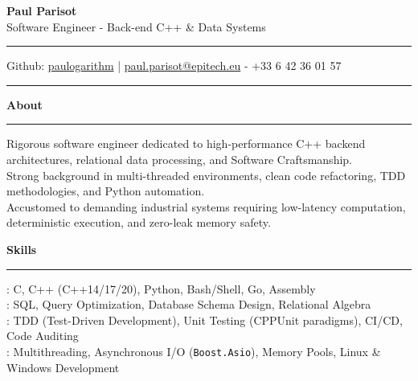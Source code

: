 \documentclass[9pt]{extarticle}
\begin{document}
\begin{center}
    {\huge\bfseries Paul Parisot}
    \\[10pt]
    {\Large Software Engineer - Back-end C++ \& Data Systems}
    \\
\end{center}

\par\vspace{-10pt}
\rule{\linewidth}{0.4pt}
\par\vspace{-10pt}

\begin{center}
    Github: \href{https://github.com/paulogarithm}{paulogarithm} 
    \quad | \quad 
    \href{mailto:paul.parisot@epitech.eu}{paul.parisot@epitech.eu} - +33 6 42 36 01 57
\end{center}

\par\vspace{-15pt}
\rule{\linewidth}{0.4pt}
\par\vspace{5pt}

{\large\bfseries About}
\par\vspace{-8pt}
\rule{\linewidth}{0.4pt}
\par\vspace{5pt}

Rigorous software engineer dedicated to high-performance C++ backend architectures, relational data processing, and Software Craftsmanship. \\
Strong background in multi-threaded environments, clean code refactoring, TDD methodologies, and Python automation. \\
Accustomed to demanding industrial systems requiring low-latency computation, deterministic execution, and zero-leak memory safety.

\par\vspace{5pt}

{\large\bfseries Skills}
\par\vspace{-8pt}
\rule{\linewidth}{0.4pt}
\par\vspace{5pt}

\hspace*{5pt}{\bfseries Core Languages}: C, C++ (C++14/17/20), Python, Bash/Shell, Go, Assembly \\
\hspace*{5pt}{\bfseries Databases \& Data}: SQL, Query Optimization, Database Schema Design, Relational Algebra \\
\hspace*{5pt}{\bfseries Quality \& Engineering}: TDD (Test-Driven Development), Unit Testing (CPPUnit paradigms), CI/CD, Code Auditing \\
\hspace*{5pt}{\bfseries Architecture}: Multithreading, Asynchronous I/O (\texttt{Boost.Asio}), Memory Pools, Linux \& Windows Development
\end{document}
